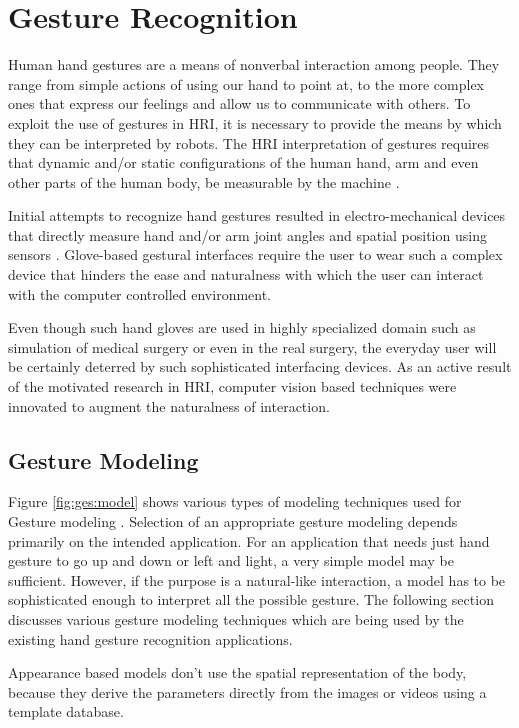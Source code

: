 \section{Gesture Recognition}
Human hand gestures are a means of nonverbal interaction among people. They range from simple actions of using our hand to point at, to the more complex ones that express our feelings and allow us to communicate with others. To exploit the use of gestures in HRI, it is necessary to provide the means by which they can be interpreted by robots. The HRI interpretation of gestures requires that dynamic and/or static configurations of the human hand, arm and even other parts of the human body, be measurable by the machine \cite{6}. 

Initial attempts to recognize hand gestures resulted in electro-mechanical devices that directly measure hand and/or arm joint angles and spatial position using sensors \cite{3}. Glove-based gestural interfaces require the user to wear such a complex device that hinders the ease and naturalness with which the user can interact with the computer controlled environment. 

Even though such hand gloves are used in highly specialized domain such as simulation of medical surgery or even in the real surgery, the everyday user will be certainly deterred by such sophisticated interfacing devices. As an active result of the motivated research in HRI, computer vision based techniques were innovated to augment the naturalness of interaction.


\subsection{Gesture Modeling}
Figure \ref{fig:ges:model} shows various types of modeling techniques used for Gesture modeling \cite{3}. Selection of an appropriate gesture modeling depends primarily on the intended application. For an application that needs just hand gesture to go up and down or left and light, a very simple model may be sufficient. However, if the purpose is a natural-like interaction, a model has to be sophisticated enough to interpret all the possible gesture. The following section discusses various gesture modeling techniques which are being used by the existing hand gesture recognition applications. 

Appearance based models don't use the spatial representation of the body, because they derive the parameters directly from the images or videos using a template database. 

